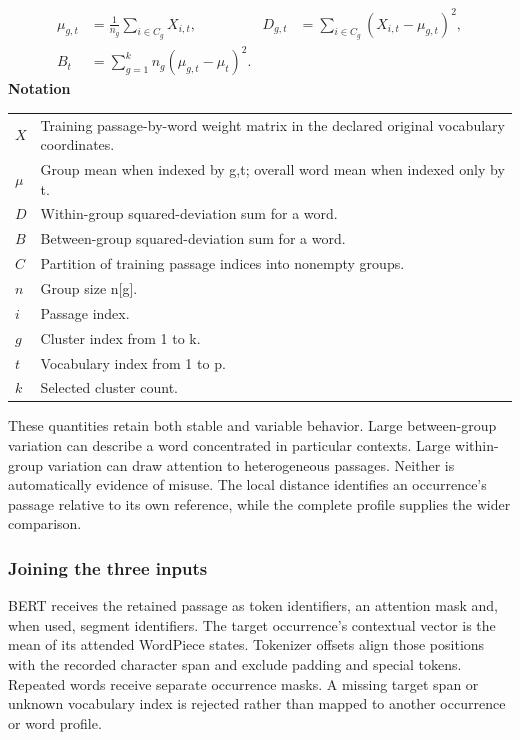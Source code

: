 \documentclass[10pt,letterpaper]{article}
\newcommand{\notlabel}{\noindent\textbf{Notation}\par\nobreak\vspace{4pt}}
\begin{document}
\par\noindent\begin{minipage}{\linewidth}
\begin{equation}\label{eq:profilemoments}
\begin{aligned}\mu_{g,t}&=\frac1{n_g}\sum_{i\in C_g}X_{i,t},&D_{g,t}&=\sum_{i\in C_g}(X_{i,t}-\mu_{g,t})^2,\\B_t&=\sum_{g=1}^k n_g(\mu_{g,t}-\mu_t)^2.\end{aligned}
\end{equation}
\notlabel
{\fontsize{8.5}{10.5}\selectfont\setlength{\tabcolsep}{0pt}\renewcommand{\arraystretch}{1.12}
\begin{tabularx}{\linewidth}{@{}p{.14\linewidth}X@{}}
$X$ & Training passage-by-word weight matrix in the declared original vocabulary coordinates.\\
$\mu$ & Group mean when indexed by g,t; overall word mean when indexed only by t.\\
$D$ & Within-group squared-deviation sum for a word.\\
$B$ & Between-group squared-deviation sum for a word.\\
$C$ & Partition of training passage indices into nonempty groups.\\
$n$ & Group size n[g].\\
$i$ & Passage index.\\
$g$ & Cluster index from 1 to k.\\
$t$ & Vocabulary index from 1 to p.\\
$k$ & Selected cluster count.\\
\end{tabularx}}
\par\vspace{2pt}
\end{minipage}\par
These quantities retain both stable and variable behavior. Large between-group variation can describe a word concentrated in particular contexts. Large within-group variation can draw attention to heterogeneous passages. Neither is automatically evidence of misuse. The local distance identifies an occurrence's passage relative to its own reference, while the complete profile supplies the wider comparison.\par

\subsubsection{Joining the three inputs}
BERT receives the retained passage as token identifiers, an attention mask and, when used, segment identifiers. The target occurrence's contextual vector is the mean of its attended WordPiece states. Tokenizer offsets align those positions with the recorded character span and exclude padding and special tokens. Repeated words receive separate occurrence masks. A missing target span or unknown vocabulary index is rejected rather than mapped to another occurrence or word profile.\par
\end{document}
